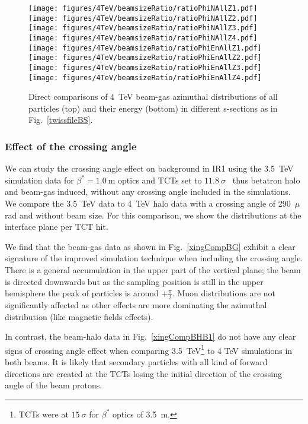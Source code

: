 \begin{figure}%
\begin{center}
  \texttt{[image: figures/4TeV/beamsizeRatio/ratioPhiNAllZ1.pdf]}
  \texttt{[image: figures/4TeV/beamsizeRatio/ratioPhiNAllZ2.pdf]}
  \texttt{[image: figures/4TeV/beamsizeRatio/ratioPhiNAllZ3.pdf]}
  \texttt{[image: figures/4TeV/beamsizeRatio/ratioPhiNAllZ4.pdf]}
  \texttt{[image: figures/4TeV/beamsizeRatio/ratioPhiEnAllZ1.pdf]}
  \texttt{[image: figures/4TeV/beamsizeRatio/ratioPhiEnAllZ2.pdf]}
  \texttt{[image: figures/4TeV/beamsizeRatio/ratioPhiEnAllZ3.pdf]}
  \texttt{[image: figures/4TeV/beamsizeRatio/ratioPhiEnAllZ4.pdf]}
\end{center}
\vspace{-0.6cm}
 \caption{Direct comparisons of 4~TeV beam-gas azimuthal distributions of all particles (top) and their energy (bottom) in different s-sections as in Fig.~\ref{twissfileBS}.
  \label{bsZAll}}
\end{figure}

 
\subsubsection{Effect of the crossing angle}

We can study the crossing angle effect on background in IR1 using the 3.5~TeV simulation data for $\beta^* = 1.0~$m optics and TCTs set to $11.8~\sigma$~\cite{nimPaperRod} thus betatron halo and beam-gas induced, without any crossing angle included in the simulations. We compare the 3.5~TeV data to 4~TeV halo data with a crossing angle of 290~$\mu$rad and without beam size. For this comparison, we show the distributions at the interface plane per TCT hit. 

We find that the beam-gas data as shown in Fig.~\ref{xingCompBG} exhibit a clear signature of the improved simulation technique when including the crossing angle. There is a general accumulation in the upper part of the vertical plane; the beam is directed downwards but as the sampling position is still in the upper hemisphere the peak of particles is around $+ \frac{\pi}{2}$. Muon distributions are not significantly affected as other effects are more dominating the azimuthal distribution (like magnetic fields effects). 

In contrast, the beam-halo data in Fig.~\ref{xingCompBHB1} do not have any clear signs of crossing angle effect when comparing 3.5~TeV\footnote{TCTs were at $15~\sigma$ for $\beta^*$ optics of 3.5~m.} to 4 TeV simulations in both beams. It is likely that secondary particles with all kind of forward directions are created at the TCTs losing the initial direction of the crossing angle of the beam protons.

